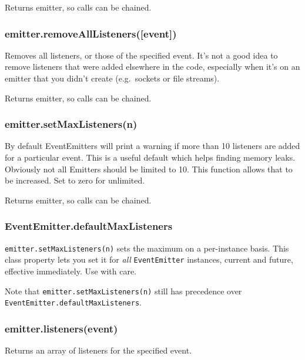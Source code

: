 Returns emitter, so calls can be chained.

\subsubsection{emitter.removeAllListeners({[}event{]})}\label{emitter.removealllistenersevent}

Removes all listeners, or those of the specified event. It's not a good
idea to remove listeners that were added elsewhere in the code,
especially when it's on an emitter that you didn't create (e.g.~sockets
or file streams).

Returns emitter, so calls can be chained.

\subsubsection{emitter.setMaxListeners(n)}\label{emitter.setmaxlistenersn}

By default EventEmitters will print a warning if more than 10 listeners
are added for a particular event. This is a useful default which helps
finding memory leaks. Obviously not all Emitters should be limited to
10. This function allows that to be increased. Set to zero for
unlimited.

Returns emitter, so calls can be chained.

\subsubsection{EventEmitter.defaultMaxListeners}\label{eventemitter.defaultmaxlisteners}

\texttt{emitter.setMaxListeners(n)} sets the maximum on a per-instance
basis. This class property lets you set it for \emph{all}
\texttt{EventEmitter} instances, current and future, effective
immediately. Use with care.

Note that \texttt{emitter.setMaxListeners(n)} still has precedence over
\texttt{EventEmitter.defaultMaxListeners}.

\subsubsection{emitter.listeners(event)}\label{emitter.listenersevent}

Returns an array of listeners for the specified event.

\begin{Shaded}
\begin{Highlighting}[]
\NormalTok{(}\NormalTok{, } 
  \NormalTok{(}\NormalTok{);}
\NormalTok{\});}
\NormalTok{(}\NormalTok{(}\NormalTok{(}\NormalTok{))); }\CommentTok{// [ [Function] ]}
\end{Highlighting}
\end{Shaded}


